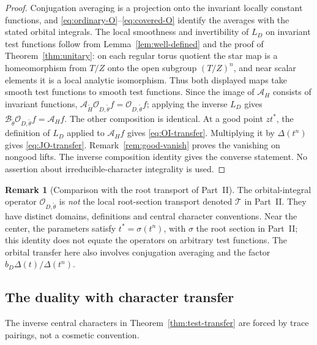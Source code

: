 \documentclass[11pt]{article}
\newcommand{\tH}{\widetilde H}
\theoremstyle{plain}
\theoremstyle{definition}
\newtheorem{remark}[theorem]{Remark}
\begin{document}
\begin{proof}
Conjugation averaging is a projection onto the invariant locally constant
functions, and \eqref{eq:ordinary-O}--\eqref{eq:covered-O} identify the
averages with the stated orbital integrals. The local smoothness and
invertibility of $L_D$ on invariant test functions follow from
Lemma~\ref{lem:well-defined} and the proof of
Theorem~\ref{thm:unitary}: on each regular torus quotient the star map is
a homeomorphism from $T/Z$ onto the open subgroup $(T/Z)^n$, and near
scalar elements it is a local analytic isomorphism. Thus both displayed
maps take smooth test functions to smooth test functions.
Since the image of $\mathcal A_H$ consists of invariant functions,
$\mathcal A_{\tH}\mathcal O_{D,\widetilde\theta}f
=\mathcal O_{D,\widetilde\theta}f$; applying the inverse $L_D$
gives $\mathcal B_{\widetilde\theta}\mathcal O_{D,\widetilde\theta}f
=\mathcal A_Hf$. The other composition is identical.
At a good point $z t^*$, the definition of $L_D$ applied to
$\mathcal A_Hf$ gives \eqref{eq:OI-transfer}. Multiplying it by
$\Delta(t^n)$ gives \eqref{eq:JO-transfer}. Remark~\ref{rem:good-vanish}
proves the vanishing on nongood lifts. The inverse composition identity
gives the converse statement. No assertion about irreducible-character
integrality is used.
\end{proof}

\begin{remark}[Comparison with the root transport of Part~II]\label{rem:root-comparison}
The orbital-integral operator $\mathcal O_{D,\widetilde\theta}$ is
\emph{not} the local root-section transport denoted $\mathcal T$
in Part~II. They have distinct domains, definitions and central
character conventions.  Near the center, the parameters satisfy
$t^*=\sigma(t^n)$, with $\sigma$ the root section in Part~II;
this identity does not equate the operators on arbitrary test
functions. The orbital transfer here also involves conjugation
averaging and the factor $b_D\Delta(t)/\Delta(t^n)$.
\end{remark}

\subsection{The duality with character transfer}
The inverse central characters in Theorem~\ref{thm:test-transfer} are
forced by trace pairings, not a cosmetic convention.
\end{document}
